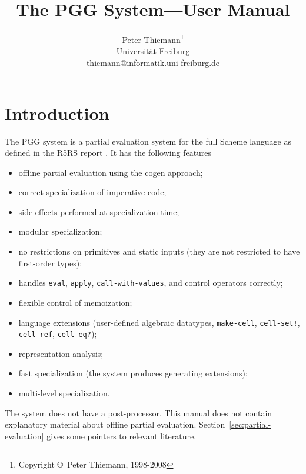 \documentclass[11pt]{article}
\begin{document}
\title{The PGG System---User Manual}
\author{Peter Thiemann\thanks{Copyright \copyright~Peter Thiemann, 1998-2008}\\
  Universität Freiburg\\
  thiemann@informatik.uni-freiburg.de}
\maketitle


\section{Introduction}
\label{sec:introduction}

The PGG system is a partial evaluation system for the full Scheme
language as defined in the R5RS report \cite{KelseyClingerRees1998}.
It has the following features
\begin{itemize}
\item offline partial evaluation using the cogen approach;
\item correct specialization of imperative code;
\item side effects performed at specialization time;
\item modular specialization;
\item no restrictions on primitives and static inputs (they are not
  restricted to have first-order types);
\item handles \texttt{eval}, \texttt{apply},
  \texttt{call-with-values}, and control operators correctly;
\item flexible control of memoization;
\item language extensions (user-defined algebraic datatypes,
  \texttt{make-cell}, \texttt{cell-set!}, \texttt{cell-ref},
  \texttt{cell-eq?}); 
\item representation analysis;
\item fast specialization (the system produces generating extensions);
\item multi-level specialization.
\end{itemize}
The system does not have a post-processor.
This manual does not contain explanatory material about offline
partial evaluation. Section~\ref{sec:partial-evaluation} gives some
pointers to relevant literature.

\begin{small}
\clearpage
\tableofcontents
\clearpage
\end{small}
\end{document}
